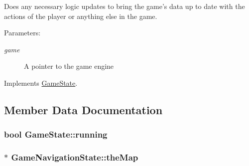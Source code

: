 Does any necessary logic updates to bring the game's data up to date with the actions of the player or anything else in the game.

\begin{Desc}
\item[Parameters:]
\begin{description}
\item[{\em game}]A pointer to the game engine \end{description}
\end{Desc}


Implements \hyperlink{class_game_state_100ca49bc95afce1d5c5b756708bbc2b}{GameState}.

\subsection{Member Data Documentation}
\hypertarget{class_game_state_391df04a740c7480270d3c71a578b43a}{
\subsubsection[{running}]{\setlength{\rightskip}{0pt plus 5cm}bool {\bf GameState::running}}}
\label{dd/d87/class_game_state_391df04a740c7480270d3c71a578b43a}


\hypertarget{class_game_navigation_state_83154f9523275696f30c13447e1d74f3}{
\subsubsection[{theMap}]{$\ast$ {\bf GameNavigationState::theMap}}}
\label{de/d2a/class_game_navigation_state_83154f9523275696f30c13447e1d74f3}


